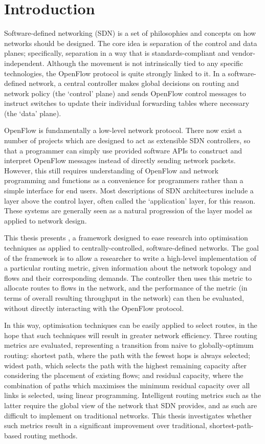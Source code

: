 \chapter{Introduction}
\label{ch:intro}

Software-defined networking (SDN) is a set of philosophies and concepts on how networks should be designed. The core idea is separation of the control and data planes; specifically, separation in a way that is standards-compliant and vendor-independent. Although the movement is not intrinsically tied to any specific technologies, the OpenFlow protocol is quite strongly linked to it. In a software-defined network, a central controller makes global decisions on routing and network policy (the `control' plane) and sends OpenFlow control messages to instruct switches to update their individual forwarding tables where necessary (the `data' plane).

OpenFlow is fundamentally a low-level network protocol. There now exist a number of projects which are designed to act as extensible SDN controllers, so that a programmer can simply use provided software APIs to construct and interpret OpenFlow messages instead of directly sending network packets. However, this still requires understanding of OpenFlow and network programming and functions as a convenience for programmers rather than a simple interface for end users.  Most descriptions of SDN architectures include a layer above the control layer, often called the `application' layer, for this reason. These systems are generally seen as a natural progression of the layer model as applied to network design.

This thesis presents \thesis{}, a framework designed to ease research into optimisation techniques as applied to centrally-controlled, software-defined networks. The goal of the framework is to allow a researcher to write a high-level implementation of a particular routing metric, given information about the network topology and flows and their corresponding demands. The controller then uses this metric to allocate routes to flows in the network, and the performance of the metric (in terms of overall resulting throughput in the network) can then be evaluated, without directly interacting with the OpenFlow protocol.

In this way, optimisation techniques can be easily applied to select routes, in the hope that such techniques will result in greater network efficiency. Three routing metrics are evaluated, representing a transition from naive to globally-optimum routing: shortest path, where the path with the fewest hops is always selected; widest path, which selects the path with the highest remaining capacity after considering the placement of existing flows; and residual capacity, where the combination of paths which maximises the minimum residual capacity over all links is selected, using linear programming. Intelligent routing metrics such as the latter require the global view of the network that SDN provides, and as such are difficult to implement on traditional networks. This thesis investigates whether such metrics result in a significant improvement over traditional, shortest-path-based routing methods.

